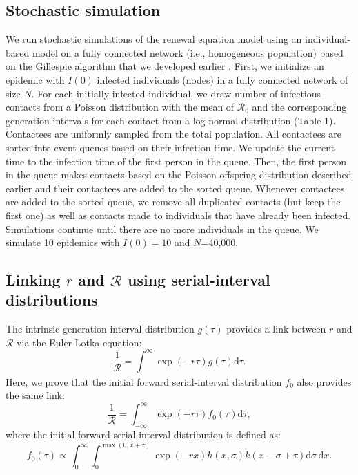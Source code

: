 \documentclass[12pt]{article}
\newcommand{\Rx}[1]{\ensuremath{{\mathcal R}_{#1}}\xspace}
\newcommand{\Ro}{\Rx{0}}
\newcommand{\RR}{\ensuremath{{\mathcal R}}\xspace}
\begin{document}
\subsection{Stochastic simulation}

We run stochastic simulations of the renewal equation model using an individual-based model on a fully connected network (i.e., homogeneous population) based on the Gillespie algorithm that we developed earlier \citep{park2019inferring}.
First, we initialize an epidemic with $I(0)$ infected individuals (nodes) in a fully connected network of size $N$. 
For each initially infected individual, we draw number of infectious contacts from a Poisson distribution with the mean of \Ro and the corresponding generation intervals for each contact from a log-normal distribution (Table 1).
Contactees are uniformly sampled from the total population.
All contactees are sorted into event queues based on their infection time.
We update the current time to the infection time of the first person in the queue.
Then, the first person in the queue makes contacts based on the Poisson offspring distribution described earlier and their contactees are added to the sorted queue.
Whenever contactees are added to the sorted queue, we remove all duplicated contacts (but keep the first one) as well as contacts made to individuals that have already been infected.
Simulations continue until there are no more individuals in the queue.
We simulate 10 epidemics with $I(0)=10$ and $N$=40,000.

\subsection{Linking $r$ and \RR using serial-interval distributions}

The intrinsic generation-interval distribution $g(\tau)$ provides a link between $r$ and \RR via the Euler-Lotka equation:
\begin{equation}
\frac{1}{\RR} = \int_0^\infty \exp(-r\tau) g(\tau) \mathrm{d} \tau.
\end{equation}
Here, we prove that the initial forward serial-interval distribution $f_0$ also provides the same link:
\begin{equation}
\frac{1}{\RR} = \int_{-\infty}^\infty \exp(-r\tau) f_{0}(\tau) \mathrm{d} \tau,
\end{equation}
where the initial forward serial-interval distribution is defined as:
\begin{equation}
f_{0}(\tau) \propto \int_{0}^{\infty} \int_{0}^{\max(0,x+\tau)} \exp(-rx) h(x, \sigma) k(x-\sigma+\tau) \mathrm{d}\sigma\,\mathrm{d}x.
\end{equation}
\end{document}
